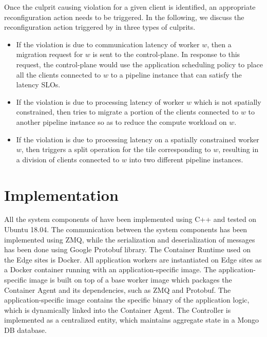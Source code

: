 \par Once the culprit causing violation for a given client is identified, an appropriate reconfiguration action needs to be triggered. In the following, we discuss the reconfiguration action triggered by \oneedge{} in three types of culprits.
\begin{itemize}
\item If the violation is due to communication latency of worker $w$, then a migration request for $w$ is sent to the control-plane. In response to this request, the control-plane would use the application scheduling policy to place all the clients connected to $w$ to a pipeline instance that can satisfy the latency SLOs.
\item If the violation is due to processing latency of worker $w$ which is not spatially constrained, then \oneedge{} tries to migrate a portion of the clients connected to $w$ to another pipeline instance so as to reduce the compute workload on $w$.
\item If the violation is due to processing latency on a spatially constrained worker $w$, then \oneedge{} triggers a split operation for the tile corresponding to $w$, resulting in a division of clients connected to $w$ into two different pipeline instances.
\end{itemize}

\section{Implementation}
\label{sec:oneedge_impl}
All the system components of \oneedge{} have been implemented using C++ and tested on Ubuntu 18.04. The communication between the system components has been implemented using ZMQ, while the serialization and deserialization of messages has been done using Google Protobuf library. The Container Runtime used on the Edge sites is Docker. All application workers are instantiated on Edge sites as a Docker container running with an application-specific image. The application-specific image is built on top of a base worker image which packages the Container Agent and its dependencies, such as ZMQ and Protobuf. The application-specific image contains the specific binary of the application logic, which is dynamically linked into the Container Agent. The Controller is implemented as a centralized entity, which maintains aggregate state in a Mongo DB database. 


